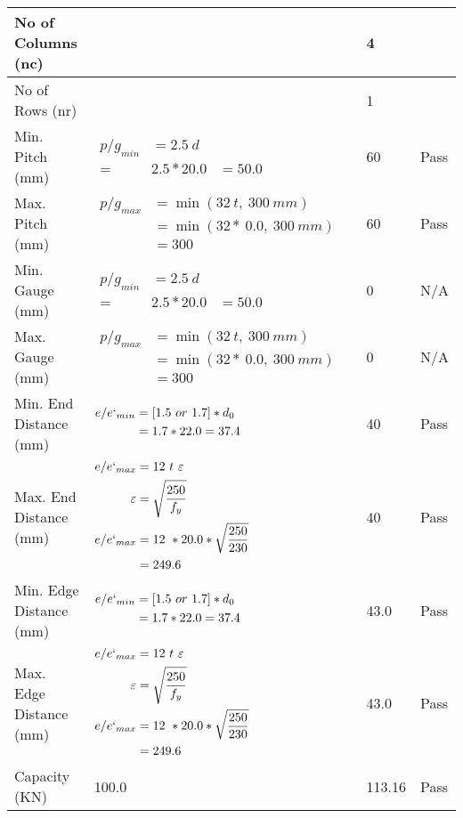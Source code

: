 \documentclass{article}%
\begin{document}
\begin{longtable}{|p{3cm}|p{5cm}|p{7cm}|p{1cm}|}
\hline%
No of Columns (nc)&&4&\\%
\hline%
No of Rows (nr)&&1&\\%
\hline%
Min. Pitch (mm)&$\begin{aligned}p/g_{min}&= 2.5 ~ d&\\ =&2.5*20.0&=50.0\end{aligned}$&60&Pass\\%
\hline%
Max. Pitch (mm)&$\begin{aligned}p/g_{max} &=\min(32~t,~300~mm)&\\ &=\min(32 *~0.0,~ 300 ~mm)\\&=300\end{aligned}$&60&Pass\\%
\hline%
Min. Gauge (mm)&$\begin{aligned}p/g_{min}&= 2.5 ~ d&\\ =&2.5*20.0&=50.0\end{aligned}$&0&N/A\\%
\hline%
Max. Gauge (mm)&$\begin{aligned}p/g_{max} &=\min(32~t,~300~mm)&\\ &=\min(32 *~0.0,~ 300 ~mm)\\&=300\end{aligned}$&0&N/A\\%
\hline%
Min. End Distance (mm)&$\begin{aligned}e/e`_{min} &=[1.5~or~ 1.7] * d_0\\ &=1.7*22.0=37.4 \end{aligned}$&40&Pass\\%
\hline%
Max. End Distance (mm)&$\begin{aligned}e/e`_{max} &= 12~ t~ \varepsilon&\\ \varepsilon &= \sqrt{\frac{250}{f_y}}\\ e/e`_{max}&=12 ~*20.0*\sqrt{\frac{250}{230}}\\ &=249.6\\ \end{aligned}$&40&Pass\\%
\hline%
Min. Edge Distance (mm)&$\begin{aligned}e/e`_{min} &=[1.5~or~ 1.7] * d_0\\ &=1.7*22.0=37.4 \end{aligned}$&43.0&Pass\\%
\hline%
Max. Edge Distance (mm)&$\begin{aligned}e/e`_{max} &= 12~ t~ \varepsilon&\\ \varepsilon &= \sqrt{\frac{250}{f_y}}\\ e/e`_{max}&=12 ~*20.0*\sqrt{\frac{250}{230}}\\ &=249.6\\ \end{aligned}$&43.0&Pass\\%
\hline%
Capacity (KN)&100.0&113.16&Pass\\%
\hline%
\end{longtable}
\end{document}
